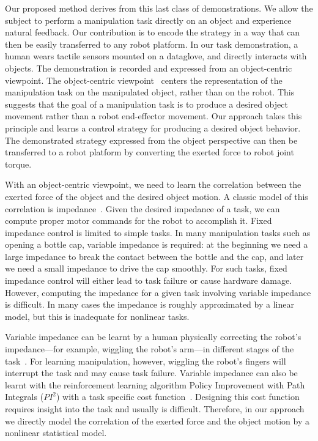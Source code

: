 Our proposed method derives from this last class of demonstrations.
We allow the subject to perform a manipulation task directly on an
object and experience natural feedback. Our contribution is to
encode the strategy in a way that can then be
easily transferred to any robot platform. In our task demonstration, a
human wears tactile sensors mounted on a dataglove, and directly
interacts with objects. The demonstration is recorded and expressed
from an object-centric viewpoint. The object-centric
viewpoint~\citep{okamura2000overview,jain2013improving,Miao2014}
centers the representation of the manipulation task on the manipulated
object, rather than on the robot.
This suggests that the goal of a manipulation task is to produce a desired
object movement rather than a robot end-effector movement. Our
approach takes this principle and learns a control strategy for
producing a desired object behavior. The demonstrated strategy
expressed from the object perspective can then be transferred to a
robot platform by converting %
the exerted force to robot joint torque.

With an object-centric viewpoint, we need to learn the correlation
between the exerted force of the object and the desired object
motion. A classic model of this correlation is
impedance~\citep{howard2010transferring,wimbock2012comparison}. Given
the desired impedance of a task, we can compute proper motor commands
for the robot to accomplish it. Fixed impedance control is limited to
simple tasks. In many manipulation tasks such as opening a bottle cap,
variable impedance is required: at the beginning we need a large
impedance to break the contact between the bottle and the cap, and
later we need a small impedance to drive the cap smoothly. For such
tasks, fixed impedance control will either lead to task failure or cause
hardware damage.  However, computing the impedance for a given task
involving variable impedance is difficult.  In many cases the
impedance is roughly approximated by a linear model, but this is
inadequate for nonlinear tasks. %


Variable impedance can be learnt by a human physically correcting the
robot's impedance---for example, wiggling the robot's arm---in different stages of
the task~\citep{kronander2012online}. For learning manipulation,
however, wiggling the robot's fingers will interrupt the task and may
cause task failure.
Variable impedance can also be learnt with the reinforcement learning
algorithm Policy Improvement with Path Integrals ($PI^2$) with a task
specific cost function~\citep{buchli2011learning}. Designing this cost
function requires insight into the task and usually is
difficult. Therefore, in our approach we directly model the
correlation of the exerted force and the object motion by a nonlinear
statistical model.


